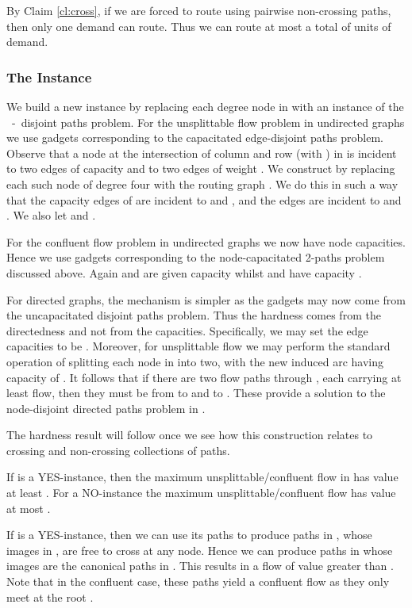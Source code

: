 \documentclass[12pt]{article}
\begin{document}
By Claim \ref{cl:cross}, if we are forced to route using pairwise non-crossing paths, then only one demand
can route. Thus we can route at most a total of  units of demand.

\subsubsection{The Instance }
We build a new instance  by replacing each degree  node in  with an instance
of the ~-~disjoint paths problem.
For the unsplittable flow problem in undirected graphs we use gadgets  corresponding to
the capacitated edge-disjoint paths problem. Observe that a
node at the intersection of column  and row  (with ) in  is incident to two edges of capacity
 and to two edges of weight .  We
construct   by replacing each such node of degree four with
the routing graph . We do this in such a way that the capacity 
edges of  are incident to  and , and the  
edges are incident to  and .
We also let  and .

For the confluent flow problem in undirected graphs we now have node capacities. Hence we use gadgets  corresponding to
the node-capacitated 2-paths problem discussed above.
Again  and  are given
capacity  whilst  and  have capacity .

For directed graphs, the mechanism is simpler as the gadgets may now come from the
uncapacitated disjoint paths problem. Thus the hardness comes from the directedness and not from the capacities.
Specifically, we may set the edge capacities to be . Moreover, for unsplittable flow we may
perform the standard operation of splitting each node in  into two, with
 the new induced arc having capacity of . It follows that if there are two flow paths through , each carrying at
 least  flow, then they must be from  to  and  to .
 These provide a solution to the node-disjoint directed paths problem in .















The hardness result will follow once we see how this construction relates to
crossing and non-crossing collections of paths.

\begin{lemma}\label{lem:yes}
If  is a YES-instance, then the maximum unsplittable/confluent flow in
 has value at least .  For a NO-instance the
maximum unsplittable/confluent flow has value at most .
\end{lemma}
  If  is a YES-instance, then we can use its paths to produce
paths in , whose images in ,   are free to cross at any node.
Hence we can produce paths in  whose images are
the canonical paths  in .
This results in   a flow of value greater than
.  Note that  in the confluent case, these paths yield
 a confluent flow as they only  meet at the root .
\end{document}
